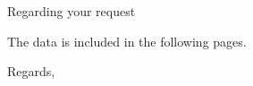 \documentclass[english,unit=imfau]{aultrdesign}
\begin{document}
\begin{ColophonData}
  \signature{Lars Madsen}
\end{ColophonData}

\begin{InformationArea}
\end{InformationArea}

\begin{fax}

\opening{Regarding your request}

The data is included in the following pages.

\closing{Regards,}

\end{fax}
\end{document}
